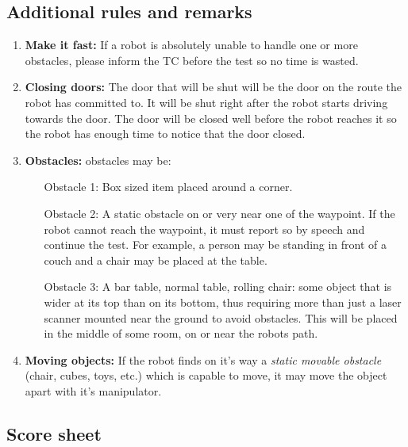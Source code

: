\subsection{Additional rules and remarks}
\begin{enumerate}

\item \textbf{Make it fast:} If a robot is absolutely unable to handle one or more obstacles, please inform the TC before the test so no time is wasted.
\item \textbf{Closing doors:}  The door that will be shut will be the door on the route the robot has committed to. It will be shut right after the robot starts driving towards the door. The door will be closed well before the robot reaches it so the robot has enough time to notice that the door closed.
\item \textbf{Obstacles:} obstacles may be:
\begin{enumerate}
\item [Obstacle 1:] Box sized item placed around a corner. 
\item [Obstacle 2:] A static obstacle on or very near one of the waypoint. If the robot cannot reach the waypoint, it must report so by speech and continue the test. For example, a person may be standing in front of a couch and a chair may be placed at the table. 
\item [Obstacle 3:] A bar table, normal table, rolling chair: some object that is wider at its top than on its bottom, thus requiring more than just a laser scanner mounted near the ground to avoid obstacles. This will be placed in the middle of some room, on or near the robots path.
\end{enumerate}
\item \textbf{Moving objects:} If the robot finds on it's way a \textit{static movable obstacle} (chair, cubes, toys, etc.) which is capable to move, it may move the object apart with it's manipulator.
\end{enumerate}

%

\subsection{Score sheet}

